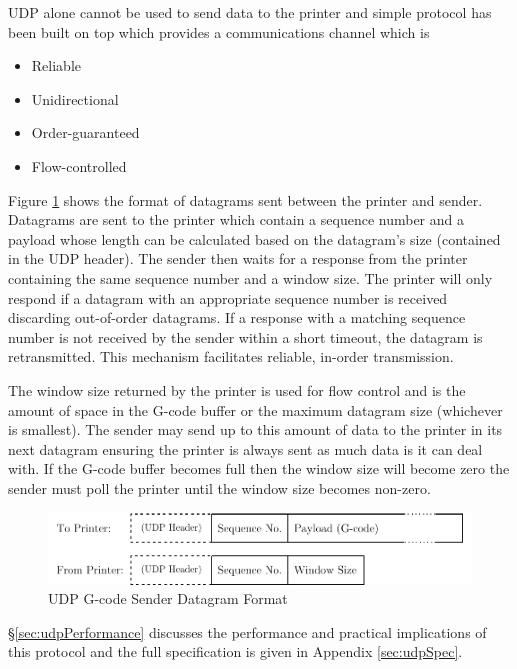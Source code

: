 					UDP alone cannot be used to send data to the printer and simple
					protocol has been built on top which provides a communications
					channel which is
					\begin{itemize}
						\item Reliable
						\item Unidirectional
						\item Order-guaranteed
						\item Flow-controlled
					\end{itemize}
					
					Figure \ref{fig:datagram} shows the format of datagrams sent between
					the printer and sender. Datagrams are sent to the printer which
					contain a sequence number and a payload whose length can be calculated
					based on the datagram's size (contained in the UDP header). The sender
					then waits for a response from the printer containing the same
					sequence number and a window size. The printer will only respond if a
					datagram with an appropriate sequence number is received discarding
					out-of-order datagrams. If a response with a matching sequence number
					is not received by the sender within a short timeout, the datagram is
					retransmitted. This mechanism facilitates reliable, in-order
					transmission.
					
					The window size returned by the printer is used for flow control and
					is the amount of space in the G-code buffer or the maximum datagram
					size (whichever is smallest). The sender may send up to this amount of
					data to the printer in its next datagram ensuring the printer is
					always sent as much data is it can deal with. If the G-code buffer
					becomes full then the window size will become zero the sender must
					poll the printer until the window size becomes non-zero.
					
					\begin{figure}
						\includegraphics[width=1\textwidth]{diagrams/datagram.pdf}
						\caption{UDP G-code Sender Datagram Format}
						\label{fig:datagram}
					\end{figure}
					
					\S\ref{sec:udpPerformance} discusses the performance and practical
					implications of this protocol and the full specification is given in
					Appendix \ref{sec:udpSpec}.
			
